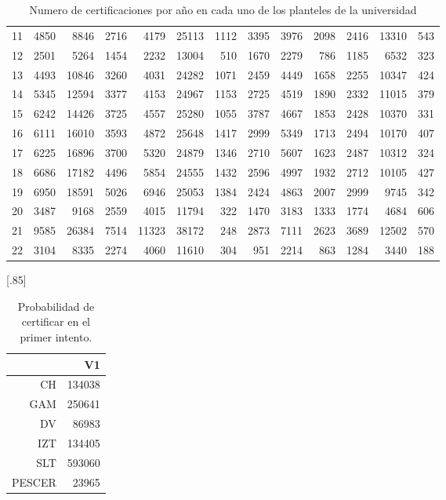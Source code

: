 \documentclass[12pt]{article}
\begin{document}
\begin{table}[ht]
{\begin{tabular}{||c||rrrrrr||rrrrrr||}
  11 & 4850 & 8846 & 2716 & 4179& 25113 &  1112& 3395 & 3976 & 2098 & 2416 &13310  &  543\\
  12 & 2501 & 5264 & 1454 & 2232& 13004  &  510& 1670 & 2279 &  786 & 1185 & 6532  &  323\\
  13 & 4493 &10846 & 3260 & 4031& 24282  & 1071& 2459 & 4449 & 1658 & 2255 &10347  &  424\\
  14 & 5345 &12594 & 3377 & 4153& 24967  & 1153& 2725 & 4519 & 1890 & 2332 &11015  &  379\\
  15 & 6242 &14426 & 3725 & 4557& 25280  & 1055& 3787 & 4667 & 1853 & 2428 &10370  &  331\\
  16 & 6111 &16010 & 3593 & 4872& 25648  & 1417& 2999 & 5349 & 1713 & 2494 &10170  &  407\\
  17 & 6225 &16896 & 3700 & 5320& 24879  & 1346& 2710 & 5607 & 1623 & 2487 &10312  &  324\\
  18 & 6686 &17182 & 4496 & 5854& 24555  & 1432& 2596 & 4997 & 1932 & 2712 &10105  &  427\\
  19 & 6950 &18591 & 5026 & 6946& 25053  & 1384& 2424 & 4863 & 2007 & 2999 & 9745  &  342\\
  20 & 3487 & 9168 & 2559 & 4015& 11794  &  322& 1470 & 3183 & 1333 & 1774 & 4684  &  606\\
  21 & 9585 &26384 & 7514 &11323& 38172  &  248& 2873 & 7111 & 2623 & 3689 &12502  &  570\\
  22 & 3104 & 8335 & 2274 & 4060& 11610  &  304&  951 & 2214 &  863 & 1284 & 3440  &  188\\\hline\hline
\end{tabular}}
\caption{Numero de certificaciones por a\~no en cada uno de los planteles de la universidad}
\label{Tabla_Certificaciones_Plantel_Anho}
\end{table}



\begin{table}[ht!]
\centering
\scalebox{0.75}[.85]{
\begin{tabular}{rr}
  \hline
 & V1 \\ 
  \hline
CH & 134038 \\ 
  GAM & 250641 \\ 
  DV & 86983 \\ 
  IZT & 134405 \\ 
  SLT & 593060 \\ 
  PESCER & 23965 \\ 
   \hline
\end{tabular}
}
\caption{\label{Prob_Cert_Intento_1}Probabilidad de certificar en el primer intento.}
\end{table}
\end{document}
